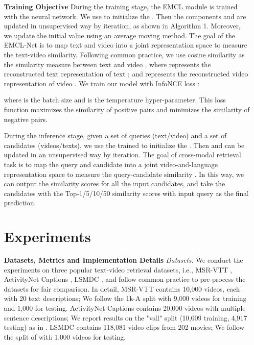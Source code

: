 \documentclass{article}
\newcommand{\myparagraph}[1]{\textbf{#1}\hspace{1.8ex}}
\newcommand{\mysubparagraph}[1]{\textit{#1}\hspace{1.8ex}}
\begin{document}
\myparagraph{Training Objective}
During the training stage, the EMCL module is trained with the neural network. We use  to initialize the . Then the components  and  are updated in unsupervised way by iteration, as shown in Algorithm 1. Moreover, we update the initial value  using an average moving method.
The goal of the EMCL-Net is to map text and video into a joint representation space to measure the text-video similarity. 
Following common practice, we use cosine similarity  as the similarity measure between text  and video , where  represents the reconstructed text representation of text ; and  represents the reconstructed video representation of video . 
We train our model with  InfoNCE loss \cite{van2018representation}:

where  is the batch size and  is the temperature hyper-parameter. This loss function maximizes the similarity of positive pairs  and minimizes the similarity of negative pairs.


During the inference stage, given a set of queries (text/video) and a set of candidates (videos/texts), we use the trained  to initialize the . Then  and  can be updated in an unsupervised way by iteration.
The goal of cross-modal retrieval task is to map the query and candidate into a joint video-and-language representation space to measure the query-candidate similarity .
In this way, we can output the similarity scores for all the input candidates, and take the candidates with the Top-1/5/10/50 similarity scores with input query as the final prediction.

\section{Experiments}
\myparagraph{Datasets, Metrics and Implementation Details}\label{Datasets_Metrics_and_Implementation_Details}
\mysubparagraph{Datasets.}
We conduct the experiments on three popular text-video  retrieval datasets, i.e., {MSR-VTT} \cite{xu2016msr}, {ActivityNet Captions} \cite{krishna2017dense}, {LSMDC} \cite{rohrbach2015a}, and follow common practice \cite{luo2021clip4clip,cheng2021improving,wang2022disentangled} to pre-process the datasets for fair comparison. In detail, {MSR-VTT} \cite{xu2016msr} contains 10,000 videos, each with 20 text descriptions; We follow the 1k-A split \cite{liu2019use} with 9,000 videos for training and 1,000 for testing. {ActivityNet Captions} \cite{krishna2017dense} contains 20,000 videos with multiple sentence descriptions; We report results on the "vall" split (10,009 training, 4,917 testing) as in \cite{gabeur2020multi}. {LSMDC} \cite{rohrbach2015a} contains 118,081 video clips from 202 movies; We follow the split of \cite{gabeur2020multi} with 1,000 videos for testing.
\end{document}
